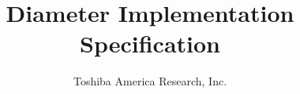 \documentclass{article}
\begin{document}
\begin{titlepage}
\title{Diameter Implementation Specification}
\author{Toshiba America Research, Inc.}
\end{titlepage}
\maketitle
\newpage

\end{document}
